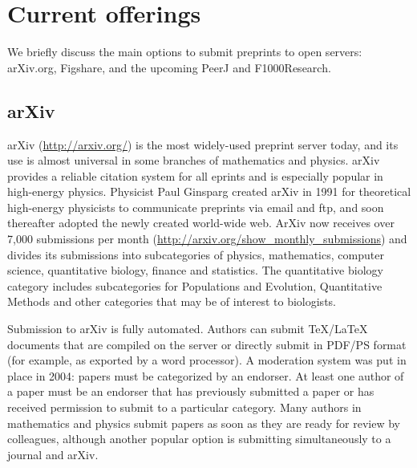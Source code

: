 \documentclass[letterpaper,twocolumn,superscriptaddress,showkeys]{revtex4}
\begin{document}

\section{Current offerings}

We briefly discuss the main options to submit preprints to open servers:
arXiv.org, Figshare, and the upcoming PeerJ and F1000Research.

\subsection{arXiv}

arXiv (\url{http://arxiv.org/}) is the most widely-used preprint server today,
and its use is almost universal in some branches of mathematics and physics.
arXiv provides a reliable citation system for all eprints and is
especially popular in high-energy physics. Physicist Paul Ginsparg
created arXiv in 1991 for theoretical high-energy physicists to
communicate preprints via email and ftp, and soon thereafter adopted
the newly created world-wide web\cite{jackson2002preprints}.  ArXiv
now receives over 7,000 submissions per month
(\url{http://arxiv.org/show_monthly_submissions}) and divides its
submissions into subcategories of physics, mathematics, computer
science, quantitative biology, finance and statistics.  The
quantitative biology category includes subcategories for Populations
and Evolution, Quantitative Methods and other categories that may be
of interest to biologists.

Submission to arXiv is fully automated.  Authors can submit
\TeX{}/\LaTeX{} documents that are compiled on the server or directly
submit in PDF/PS format (for example, as exported by a word
processor).  A moderation system was put in place in 2004: papers must
be categorized by an endorser. At least one author of a paper must be
an endorser that has previously submitted a paper or has received
permission to submit to a particular category.  Many authors in
mathematics and physics submit papers as soon as they are ready for
review by colleagues, although another popular option is submitting
simultaneously to a journal and arXiv.
\end{document}
